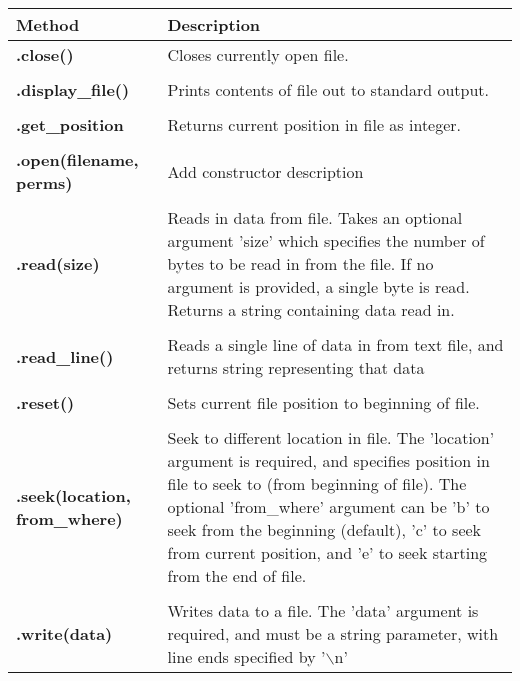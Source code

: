 \documentclass[a4paper,11pt]{report}
\begin{document}
\begin{appendix}
\begin{table}[h]
\begin{tabular}{p{4cm} p{10cm}}
\end{tabular}
\end{table}
%
\begin{table}[h]
\begin{tabular}{l p{10cm}}
\textbf{Method} & \textbf{Description}  \\ \hline
\textbf{.close()} & Closes currently open file. \\ \\
\textbf{.display\_file()} & Prints contents of file out to standard output. \\ \\
\textbf{.get\_position} & Returns current position in file as integer. \\ \\
\textbf{.open(filename, perms)} & Add constructor description \\ \\
\textbf{.read(size)} & Reads in data from file. Takes an optional argument 'size' which specifies the 
number of bytes to be read in from the file. If no argument is provided, a single byte is read. Returns a string containing data read in.\\ \\
\textbf{.read\_line()} & Reads a single line of data in from text file, and returns string representing that data \\ \\
\textbf{.reset()} & Sets current file position to beginning of file. \\ \\
\textbf{.seek(location, from\_where)} & Seek to different location in file. The 'location' argument is required, and specifies position 
in file to seek to (from beginning of file). The optional 'from\_where' argument can be 'b' to seek from the beginning (default), 'c' to seek
from current position, and 'e' to seek starting from the end of file. \\ \\
\textbf{.write(data)} & Writes data to a file. The 'data' argument is required, and must be a string parameter, with line ends 
specified by '$\backslash${n}' \\
\end{tabular}
\end{table}

\end{appendix}
\end{document}
